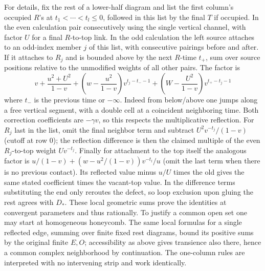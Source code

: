 For details, fix the rest of a lower-half diagram and list the first column's occupied \(R\)'s at \(t_1<\cdots<t_l\le0\), followed in this list by the final \(T\) if occupied. In the even calculation pair consecutively using the single vertical channel, with factor \(U\) for a final \(R\)-to-top link. In the odd calculation the left source attaches to an odd-index member \(j\) of this list, with consecutive pairings before and after. If it attaches to \(R_j\) and is bounded above by the next \(R\)-time \(t_+\), sum over source positions relative to the unmodified weights of all other pairs. The factor is
\[
 v+\frac{u^2+U^2}{1-v}
 +\left(w-\frac{u^2}{1-v}\right)v^{t_j-t_- -1}
 +\left(W-\frac{U^2}{1-v}\right)v^{t_+-t_j-1}
\]
where \(t_-\) is the previous time or \(-\infty\). Indeed from below/above one jumps along a free vertical segment, with a double cell at a coincident neighboring time. Both correction coefficients are \(-\gamma v\), so this respects the multiplicative reflection. For \(R_j\) last in the list, omit the final neighbor term and subtract \(U^2 v^{-t_j}/(1-v)\) (cutoff at row 0); the reflection difference is then the claimed multiple of the even \(R_j\)-to-top weight \(U v^{-t_j}\). Finally for attachment to the top itself the analogous factor is \(u/(1-v)+(w-u^2/(1-v))v^{-t_l}/u\) (omit the last term when there is no previous contact). Its reflected value minus \(u/U\) times the old gives the same stated coefficient times the vacant-top value. In the difference terms substituting the end only reroutes the defect, so loop exclusion upon gluing the rest agrees with \(D_*\). These local geometric sums prove the identities at convergent parameters and thus rationally. To justify a common open set one may start at homogeneous honeycomb. The same local formulas for a single reflected edge, summing over finite fixed rest diagrams, bound its positive sums by the original finite \(E,O\); accessibility as above gives transience also there, hence a common complex neighborhood by continuation. The one-column rules are interpreted with no intervening strip and work identically.

